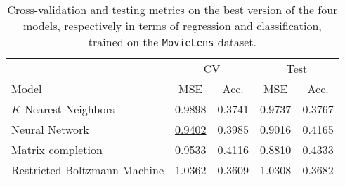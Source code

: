 \begin{table}
\centering
\begin{tabular}{lcccc}
\toprule
	      &  \multicolumn{2}{c}{CV} & \multicolumn{2}{c}{Test} \\
           \cmidrule(lr){2-3}\cmidrule(lr){4-5}
Model	 &  MSE & Acc. & MSE & Acc.  \\
\midrule
$K$-Nearest-Neighbors 					&   0.9898 &      0.3741 &   0.9737 &        0.3767 \\
Neural Network 							&  \underline{0.9402} &      0.3985 &   0.9016 &        0.4165 \\
Matrix completion 						&   0.9533 &      \underline{0.4116} &   \underline{0.8810} &        \underline{0.4333} \\
Restricted Boltzmann Machine 			&   1.0362 &      0.3609 &   1.0308 &        0.3682 \\
\bottomrule
\end{tabular}
\caption{Cross-validation and testing metrics on the best version of the four models, respectively in terms of regression and classification, trained on the \texttt{MovieLens} dataset.}
\label{tab:results.model}
\end{table}
